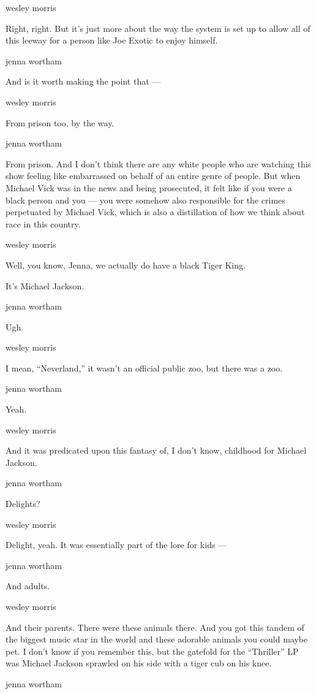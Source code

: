 wesley morris

Right, right. But it's just more about the way the system is set up to
allow all of this leeway for a person like Joe Exotic to enjoy himself.

jenna wortham

And is it worth making the point that ---

wesley morris

From prison too, by the way.

jenna wortham

From prison. And I don't think there are any white people who are
watching this show feeling like embarrassed on behalf of an entire genre
of people. But when Michael Vick was in the news and being prosecuted,
it felt like if you were a black person and you --- you were somehow
also responsible for the crimes perpetuated by Michael Vick, which is
also a distillation of how we think about race in this country.

wesley morris

Well, you know, Jenna, we actually do have a black Tiger King.

It's Michael Jackson.

jenna wortham

Ugh.

wesley morris

I mean, ``Neverland,'' it wasn't an official public zoo, but there was a
zoo.

jenna wortham

Yeah.

wesley morris

And it was predicated upon this fantasy of, I don't know, childhood for
Michael Jackson.

jenna wortham

Delights?

wesley morris

Delight, yeah. It was essentially part of the lore for kids ---

jenna wortham

And adults.

wesley morris

And their parents. There were these animals there. And you got this
tandem of the biggest music star in the world and these adorable animals
you could maybe pet. I don't know if you remember this, but the gatefold
for the ``Thriller'' LP was Michael Jackson sprawled on his side with a
tiger cub on his knee.

jenna wortham

